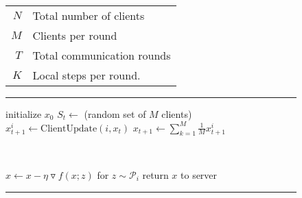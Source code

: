 \newcommand{\grad}{\triangledown}
\newcommand{\T}{\rule{0pt}{2.2ex}}

\begin{figure}

\begin{minipage}[t]{.4\textwidth}
\begin{tabular}[t]{rl}    
\toprule
\T $N$ & Total number of clients \\
\T $M$ & Clients per round \\
\T $T$ & Total communication rounds \\
\T $K$ & Local steps per round. \\
\bottomrule
\end{tabular}
\label{tab:notation}
\vfill
\end{minipage}
\hfill
%
%
%
\begin{minipage}[t]{.55\textwidth}
\rule{\textwidth}{\heavyrulewidth}  %
\vspace{-0.16in}
\begin{algorithmic}
\renewcommand{\arraystretch}{1.6}
  \STATE initialize $x_0$
     \STATE $S_t \leftarrow$ (random set of $M$ clients)
      \STATE $x_{t+1}^i \leftarrow \text{ClientUpdate}(i, x_t)$ 
     \ENDFOR
     \STATE $x_{t+1} \leftarrow \sum_{k=1}^M \frac{1}{M} x_{t+1}^i$
  \ENDFOR
  \STATE

 \ \ \
     
      \STATE $x \leftarrow x - \eta \grad f(x; z)$ for $z \sim \mathcal{P}_i$
    \ENDFOR
 \STATE return $x$ to server
 \end{algorithmic}
 \rule{\textwidth}{\heavyrulewidth}
 \label{alg:fedavg}
 \vfill
\end{minipage}

\end{figure}



